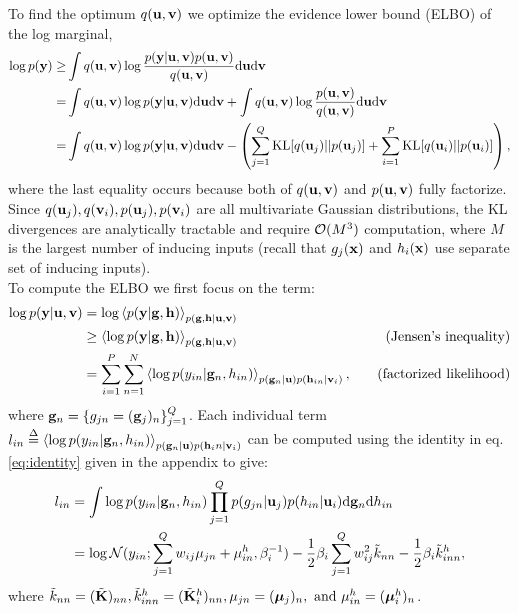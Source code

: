 \documentclass{article} %
\begin{document}
\noindent
To find the optimum $q(\mathbf{u}, \mathbf{v})$ we optimize the evidence lower bound (ELBO) of the log marginal,
\begin{align}
\nonumber
\log p(\mathbf{y}) \ge& \int q(\mathbf{u}, \mathbf{v}) \log \frac{p(\mathbf{y} | \mathbf{u}, \mathbf{v}) p(\mathbf{u}, \mathbf{v})}{q(\mathbf{u}, \mathbf{v})} \mathrm{d} \mathbf{u} \mathrm{d} \mathbf{v} \\
\nonumber
=& \int q(\mathbf{u}, \mathbf{v}) \log p(\mathbf{y} | \mathbf{u}, \mathbf{v})  \mathrm{d} \mathbf{u} \mathrm{d} \mathbf{v} 
+ \int q(\mathbf{u}, \mathbf{v}) \log \frac{p(\mathbf{u}, \mathbf{v})}{q(\mathbf{u}, \mathbf{v})} \mathrm{d} \mathbf{u} \mathrm{d} \mathbf{v} \\
\label{eq:elbo}
=& \int q(\mathbf{u}, \mathbf{v}) \log p(\mathbf{y} | \mathbf{u}, \mathbf{v})  \mathrm{d} \mathbf{u} \mathrm{d} \mathbf{v} 
- \left(\sum_{j=1}^Q \text{KL}[q(\mathbf{u}_j) || p(\mathbf{u}_j)] + \sum_{i=1}^P \text{KL}[q(\mathbf{u}_i) || p(\mathbf{u}_i)] \right),
\end{align}
where the last equality occurs because both of $q(\mathbf{u}, \mathbf{v})$ and $p(\mathbf{u}, \mathbf{v})$ fully factorize.
Since $q(\mathbf{u}_j), q(\mathbf{v}_i), p(\mathbf{u}_j), p(\mathbf{v}_i)$ are all multivariate Gaussian distributions, the KL divergences are analytically tractable and require $\mathcal{O}(M^3)$ computation, where $M$ is the largest number of inducing inputs (recall that $g_j(\mathbf{x})$ and $h_i(\mathbf{x})$ use separate set of inducing inputs). \\

\noindent To compute the ELBO we first focus on the term:
\newcommand{\llangle}{\left\langle}
\newcommand{\rrangle}{\right\rangle}
\begin{align}
\nonumber
\log p(\mathbf{y} | \mathbf{u}, \mathbf{v})
 &= \log \left\langle p(\mathbf{y} | \mathbf{g}, \mathbf{h}) \right\rangle_{p(\mathbf{g},\mathbf{h} | \mathbf{u}, \mathbf{v})} \\
 \nonumber
&\ge \left\langle \log p(\mathbf{y} | \mathbf{g}, \mathbf{h}) \right\rangle_{p(\mathbf{g},\mathbf{h} | \mathbf{u}, \mathbf{v})} \quad &\text{(Jensen's inequality)} \\
&= \sum_{i=1}^P \sum_{n=1}^N \left\langle \log p(y_{in} | \mathbf{g}_n, h_{in})  \right\rangle_{p(\mathbf{g}_n | \mathbf{u}) p(\mathbf{h}_{in} | \mathbf{v}_i)}, \quad 
 &\text{(factorized likelihood)}
\end{align}
where $\mathbf{g}_n = \{g_{jn} = (\mathbf{g}_j)_n\}_{j=1}^Q$.
Each individual term $l_{in} \overset{\Delta}{=} \left\langle \log p(y_{in} | \mathbf{g}_n, h_{in})  \right\rangle_{p(\mathbf{g}_n | \mathbf{u}) p(\mathbf{h}_in | \mathbf{v}_i)}$ can be computed using the identity in eq. \ref{eq:identity} given in the appendix to give:
\begin{align}
\nonumber
l_{in} &= \int \log p(y_{in} | \mathbf{g}_n, h_{in}) \prod_{j=1}^Q p(g_{jn} | \mathbf{u}_j) p(h_{in} | \mathbf{u}_i) \mathrm{d} \mathbf{g}_n \mathrm{d} h_{in} \\
&= \log \mathcal{N}(y_{in}; \sum_{j=1}^Q w_{ij} \mu_{jn}+ \mu^h_{in}, \beta_i^{-1})
- \frac{1}{2} \beta_i \sum_{j=1}^Q w_{ij}^2 \tilde{k}_{nn} 
- \frac{1}{2} \beta_i \tilde{k}^h_{inn},
\end{align}
where $\tilde{k}_{nn} = (\tilde{\mathbf{K}})_{nn}, \tilde{k}^h_{inn} = (\tilde{\mathbf{K}}^h_i)_{nn}, \mu_{jn} = (\boldsymbol{\mu}_j)_n, \text{ and } \mu^h_{in} = (\boldsymbol{\mu}^h_i)_n$.
\end{document}
